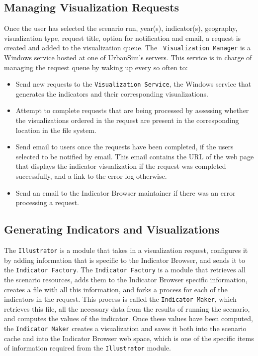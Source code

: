 \subsection{Managing Visualization Requests}    

Once the user has selected the scenario run, year(s), indicator(s),
geography, visualization type, request title, option for notification and
email, a request is created and added to the visualization queue. The {\tt
Visualization Manager} is a Windows service hosted at one of UrbanSim's
servers. This service is in charge of managing the request queue by waking
up every so often to:

\begin{itemize}
  \item Send new requests to the {\tt Visualization Service}, the Windows
    service that generates the indicators and their corresponding
    visualizations.
  \item Attempt to complete requests that are being processed by assessing
    whether the visualizations ordered in the request are present in the
    corresponding location in the file system.
  \item Send email to users once the requests have been completed, if the
     users selected to be notified by email. This email contains the
     URL of the web page that displays the indicator visualization
     if the request was completed successfully, and a link
     to the error log otherwise.
  \item Send an email to the Indicator Browser maintainer if there was an
    error processing a request.
\end{itemize}

\subsection{Generating Indicators and Visualizations}

The {\tt Illustrator} is a module that takes in a visualization request,
configures it by adding information that is specific to the Indicator
Browser, and sends it to the {\tt Indicator Factory}. The {\tt Indicator
Factory} is a module that retrieves all the scenario resources, adds them
to the Indicator Browser specific information, creates a file with all this
information, and forks a process for each of the indicators in the
request. This process is called the {\tt Indicator Maker}, which retrieves
this file, all the necessary data from the results of running the scenario,
and computes the values of the indicator.  Once these
values have been computed, the {\tt Indicator Maker} creates a
visualization and saves it both into the scenario cache and into the
Indicator Browser web space, which is one of the specific items of
information required from the {\tt Illustrator} module.






